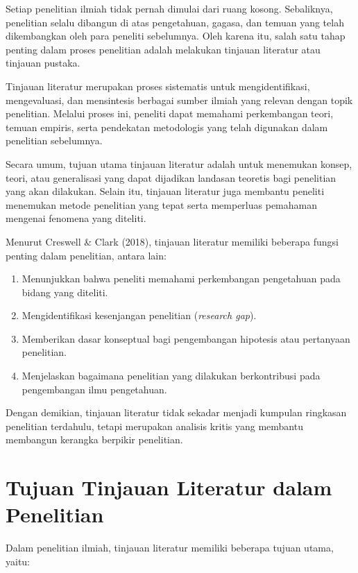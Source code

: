 \documentclass[
  indonesian,
  letterpaper,
  DIV=11,
  numbers=noendperiod]{scrreprt}
\providecommand{\tightlist}{%
  \setlength{\itemsep}{0pt}\setlength{\parskip}{0pt}}
\begin{document}
Setiap penelitian ilmiah tidak pernah dimulai dari ruang kosong.
Sebaliknya, penelitian selalu dibangun di atas pengetahuan, gagasa, dan
temuan yang telah dikembangkan oleh para peneliti sebelumnya. Oleh
karena itu, salah satu tahap penting dalam proses penelitian adalah
melakukan tinjauan literatur atau tinjauan pustaka.

Tinjauan literatur merupakan proses sistematis untuk mengidentifikasi,
mengevaluasi, dan mensintesis berbagai sumber ilmiah yang relevan dengan
topik penelitian. Melalui proses ini, peneliti dapat memahami
perkembangan teori, temuan empiris, serta pendekatan metodologis yang
telah digunakan dalam penelitian sebelumnya.

Secara umum, tujuan utama tinjauan literatur adalah untuk menemukan
konsep, teori, atau generalisasi yang dapat dijadikan landasan teoretis
bagi penelitian yang akan dilakukan. Selain itu, tinjauan literatur juga
membantu peneliti menemukan metode penelitian yang tepat serta
memperluas pemahaman mengenai fenomena yang diteliti.

Menurut Creswell \& Clark (2018), tinjauan literatur memiliki beberapa
fungsi penting dalam penelitian, antara lain:

\begin{enumerate}
\def\labelenumi{\arabic{enumi}.}
\tightlist
\item
  Menunjukkan bahwa peneliti memahami perkembangan pengetahuan pada
  bidang yang diteliti.
\item
  Mengidentifikasi kesenjangan penelitian (\emph{research gap}).
\item
  Memberikan dasar konseptual bagi pengembangan hipotesis atau
  pertanyaan penelitian.
\item
  Menjelaskan bagaimana penelitian yang dilakukan berkontribusi pada
  pengembangan ilmu pengetahuan.
\end{enumerate}

Dengan demikian, tinjauan literatur tidak sekadar menjadi kumpulan
ringkasan penelitian terdahulu, tetapi merupakan analisis kritis yang
membantu membangun kerangka berpikir penelitian.

\section{Tujuan Tinjauan Literatur dalam
Penelitian}\label{tujuan-tinjauan-literatur-dalam-penelitian}

Dalam penelitian ilmiah, tinjauan literatur memiliki beberapa tujuan
utama, yaitu:
\end{document}

